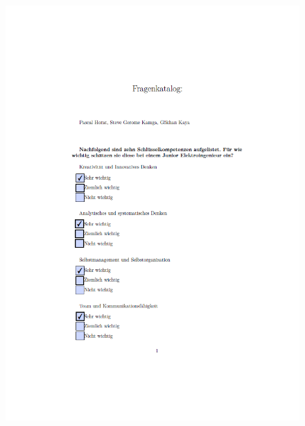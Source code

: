 \begin{figure}[ht]
	\centering
 	\includegraphics[width=1.3\textwidth]{images/Marco1.png}
 	\label{fig:fragmar1}
\end{figure}

